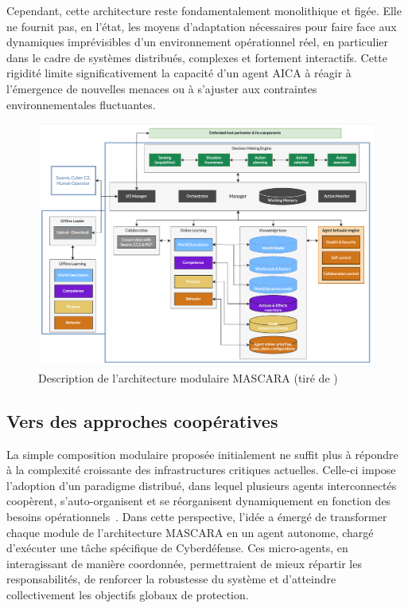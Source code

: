 Cependant, cette architecture reste fondamentalement monolithique et figée. Elle ne fournit pas, en l'état, les moyens d'adaptation nécessaires pour faire face aux dynamiques imprévisibles d'un environnement opérationnel réel, en particulier dans le cadre de systèmes distribués, complexes et fortement interactifs. Cette rigidité limite significativement la capacité d'un agent \ac{AICA} à réagir à l'émergence de nouvelles menaces ou à s'ajuster aux contraintes environnementales fluctuantes.


\begin{figure}[h!]
    \centering
    \includegraphics[width=\linewidth]{figures/MASCARA.pdf}
    \caption{Description de l'architecture modulaire MASCARA (tiré de \autocite{Kott2023})}
    \label{fig:mascara}
\end{figure}

\subsection*{Vers des approches coopératives}

La simple composition modulaire proposée initialement ne suffit plus à répondre à la complexité croissante des infrastructures critiques actuelles. Celle-ci impose l'adoption d'un paradigme distribué, dans lequel plusieurs agents interconnectés coopèrent, s'auto-organisent et se réorganisent dynamiquement en fonction des besoins opérationnels~\cite{Ferber1999, Gleizes2008}. Dans cette perspective, l'idée a émergé de transformer chaque module de l'architecture \ac{MASCARA} en un agent autonome, chargé d'exécuter une tâche spécifique de Cyberdéfense. Ces micro-agents, en interagissant de manière coordonnée, permettraient de mieux répartir les responsabilités, de renforcer la robustesse du système et d'atteindre collectivement les objectifs globaux de protection.

